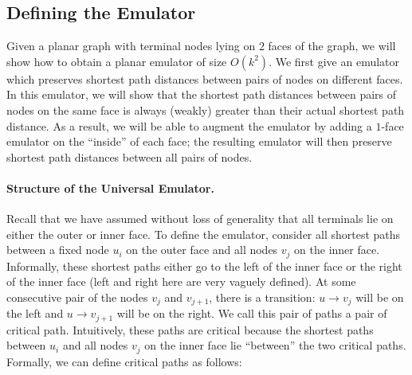 \documentclass[11pt]{article}
\newtheorem{observation}[theorem]{Observation}
\begin{document}

\iffalse
\subsection{Defining the Emulator}

Given a planar graph with terminal nodes lying on $2$ faces of the graph, we will show how to obtain a planar emulator of size $O(k^2)$. We first give an emulator which preserves shortest path distances between pairs of nodes on different faces. In this emulator, we will show that the shortest path distances between pairs of nodes on the same face is always (weakly) greater than their actual shortest path distance. As a result, we will be able to augment the emulator by adding a $1$-face emulator on the ``inside'' of each face; the resulting emulator will then preserve shortest path distances between all pairs of nodes. 

\paragraph{Structure of the Universal Emulator.} Recall that we have assumed without loss of generality that all terminals lie on either the outer or inner face. To define the emulator, consider all shortest paths between a fixed node $u_i$ on the outer face and all nodes $v_j$ on the inner face. Informally, these shortest paths either go to the left of the inner face or the right of the inner face (left and right here are very vaguely defined). At some consecutive pair of the nodes $v_j$ and $v_{j+1}$, there is a transition: $u\to v_j$ will be on the left and $u\to v_{j+1}$ will be on the right. We call this pair of paths a pair of critical path. Intuitively, these paths are critical because the shortest paths between $u_i$ and all nodes $v_j$ on the inner face lie ``between'' the two critical paths. Formally, we can define critical paths as follows:
\end{document}
